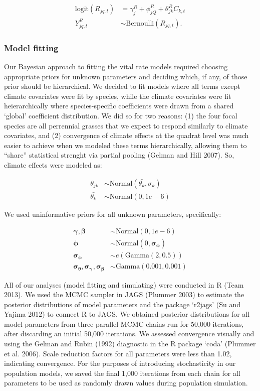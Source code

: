 \documentclass[author-year, 12pt,review]{components/elsarticle} %
\begin{document}
\begin{align}
\text{logit}(R_{jq,t}) &= \gamma^{R}_{j} + \phi^{R}_{jQ} + \theta^{R}_{jk}C_{k,t} \\
Y^{R}_{jq,t} &\sim \text{Bernoulli}(R_{jq,t}).
\end{align}

\subsubsection{Model fitting}\label{model-fitting}

Our Bayesian approach to fitting the vital rate models required choosing
appropriate priors for unknown parameters and deciding which, if any, of
those prior should be hierarchical. We decided to fit models where all
terms except climate covariates were fit by species, while the climate
covariates were fit heierarchically where species-specific coefficients
were drawn from a shared `global' coefficient distribution. We did so
for two reasons: (1) the four focal species are all perrennial grasses
that we expect to respond similarly to climate covariates, and (2)
convergence of climate effects at the quadrat level was much easier to
achieve when we modeled these terms hierarchically, allowing them to
``share'' statistical strenght via partial pooling (Gelman and Hill
2007). So, climate effects were modeled as:

\begin{align}
\theta_{jk} &\sim \text{Normal}(\bar{\theta_{k}}, \sigma_{k}) \\
\bar{\theta_{k}} &\sim \text{Normal}(0, 1e-6)
\end{align}

We used uninformative priors for all unknown parameters, specifically:

\begin{align}
\boldsymbol{\gamma, \beta} &\sim \text{Normal}(0, 1e-6) \\
\boldsymbol{\phi} &\sim \text{Normal}(0, \boldsymbol{\sigma_{\phi}}) \\
\boldsymbol{\sigma_{\phi}} &\sim e(\text{Gamma}(2, 0.5)) \\
\boldsymbol{\sigma_{\theta}, \sigma_{\gamma}, \sigma_{\beta}} &\sim \text{Gamma}(0.001, 0.001)
\end{align}

All of our analyses (model fitting and simulating) were conducted in R
(Team 2013). We used the MCMC sampler in JAGS (Plummer 2003) to estimate
the posterior distributions of model parameters and the package `r2jags'
(Su and Yajima 2012) to connect R to JAGS. We obtained posterior
distributions for all model parameters from three parallel MCMC chains
run for 50,000 iterations, after discarding an initial 50,000
iterations. We assessed convergence visually and using the Gelman and
Rubin (1992) diagnostic in the R package `coda' (Plummer et al. 2006).
Scale reduction factors for all parameters were less than 1.02,
indicating convergence. For the purposes of introducing stochasticity in
our population models, we saved the final 1,000 iterations from each
chain for all parameters to be used as randomly drawn values during
population simulation.
\end{document}
